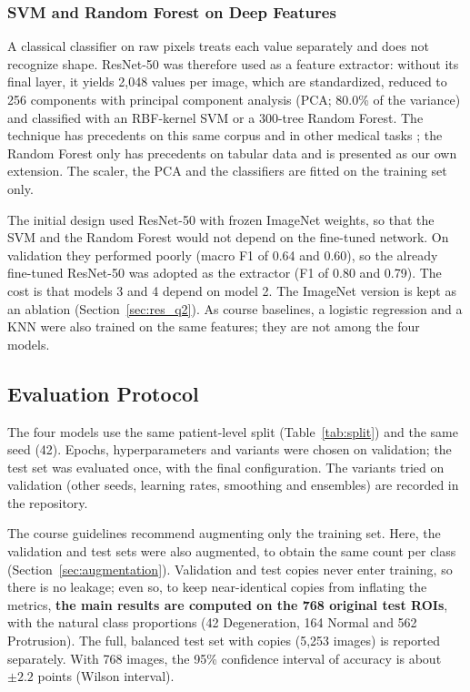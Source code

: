 \subsubsection{SVM and Random Forest on Deep Features}
A classical classifier on raw pixels treats each value separately and does not recognize shape. ResNet-50 was therefore used as a feature extractor: without its final layer, it yields 2,048 values per image, which are standardized, reduced to 256 components with principal component analysis (PCA; 80.0\% of the variance) and classified with an RBF-kernel SVM or a 300-tree Random Forest. The technique has precedents on this same corpus \cite{sari2025} and in other medical tasks \cite{khoiwal2024}; the Random Forest only has precedents on tabular data \cite{zhang2023} and is presented as our own extension. The scaler, the PCA and the classifiers are fitted on the training set only.

The initial design used ResNet-50 with frozen ImageNet weights, so that the SVM and the Random Forest would not depend on the fine-tuned network. On validation they performed poorly (macro F1 of 0.64 and 0.60), so the already fine-tuned ResNet-50 was adopted as the extractor (F1 of 0.80 and 0.79). The cost is that models 3 and 4 depend on model 2. The ImageNet version is kept as an ablation (Section~\ref{sec:res_q2}). As course baselines, a logistic regression and a KNN were also trained on the same features; they are not among the four models.

\subsection{Evaluation Protocol}
\label{sec:protocol}
The four models use the same patient-level split (Table~\ref{tab:split}) and the same seed (42). Epochs, hyperparameters and variants were chosen on validation; the test set was evaluated once, with the final configuration. The variants tried on validation (other seeds, learning rates, smoothing and ensembles) are recorded in the repository.

The course guidelines recommend augmenting only the training set. Here, the validation and test sets were also augmented, to obtain the same count per class (Section~\ref{sec:augmentation}). Validation and test copies never enter training, so there is no leakage; even so, to keep near-identical copies from inflating the metrics, \textbf{the main results are computed on the 768 original test ROIs}, with the natural class proportions (42 Degeneration, 164 Normal and 562 Protrusion). The full, balanced test set with copies (5,253 images) is reported separately. With 768 images, the 95\% confidence interval of accuracy is about $\pm 2.2$ points (Wilson interval).
